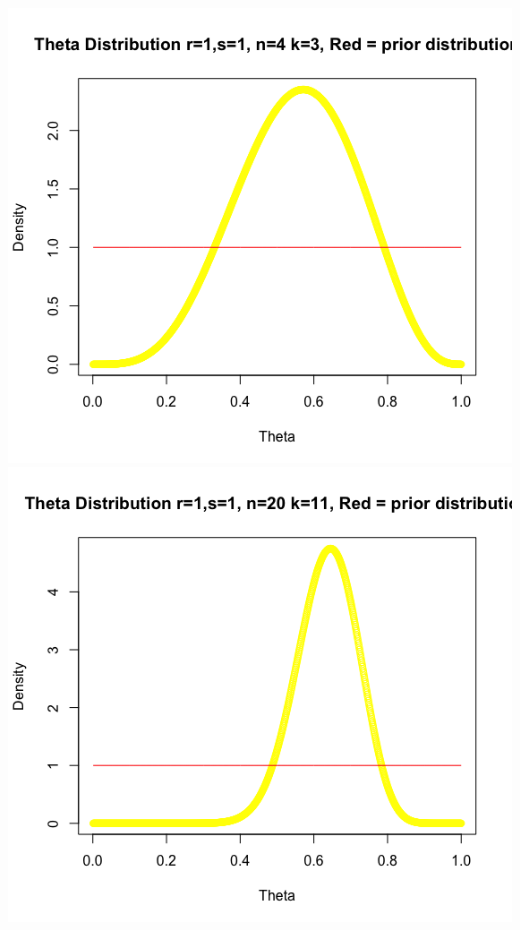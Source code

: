 \documentclass[svgnames]{article}
\begin{document}
\begin{enumerate}[label = \alph*.]
\includegraphics[scale=.5]{1-1-4-3}
$$$$
\includegraphics[scale=.5]{1-1-20-11}
$$$$

\end{enumerate}
\end{document}
